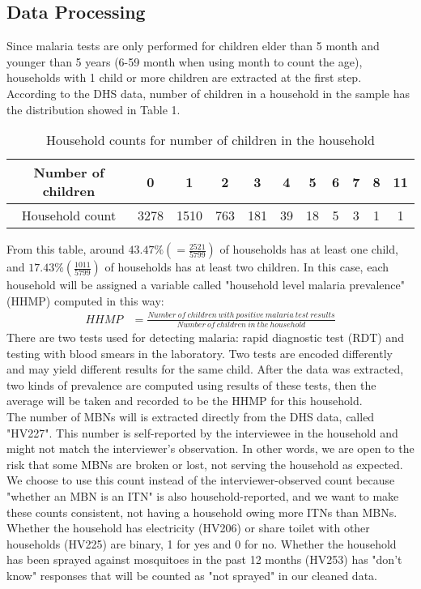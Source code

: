 \documentclass[11pt]{article}
\begin{document}
\subsection{Data Processing}
Since malaria tests are only performed for children elder than 5 month and younger than 5 years (6-59 month when using month to count the age), households with 1 child or more children are extracted at the first step. According to the DHS data, number of children in a household in the sample has the distribution showed in Table 1.
\begin{table}[h]
\centering
 \begin{tabular}{c | c c c c c c c c c c} 
 Number of children & 0 & 1 & 2 & 3 & 4 & 5 & 6 & 7 & 8 & 11 \\ 
 \hline
 Household count & 3278 & 1510 & 763 & 181 & 39 & 18 & 5 & 3 & 1 & 1
\end{tabular}
\caption{Household counts for number of children in the household}
\label{tab:abc}
\end{table}
From this table, around $43.47\% (=\frac{2521}{5799})$ of households has at least one child, and $17.43\%(\frac{1011}{5799})$ of households has at least two children. In this case, each household will be assigned a variable called "household level malaria prevalence" (HHMP) computed in this way:
\begin{align*}
    HHMP &= \frac{Number\ of\ children\ with\ positive\  malaria\ test\  results}{Number\ of\ children\ in\ the\ household}
\end{align*}
There are two tests used for detecting malaria: rapid diagnostic test (RDT) and testing with blood smears in the laboratory. Two tests are encoded differently and may yield different results for the same child. After the data was extracted, two kinds of prevalence are computed using results of these tests, then the average will be taken and recorded to be the HHMP for this household.  \\
The number of MBNs will is extracted directly from the DHS data, called "HV227". This number is self-reported by the interviewee in the household and might not match the interviewer's observation. In other words, we are open to the risk that some MBNs are broken or lost, not serving the household as expected. We choose to use this count instead of the interviewer-observed count because "whether an MBN is an ITN" is also household-reported, and we want to make these counts consistent, not having a household owing more ITNs than MBNs.  \\
Whether the household has electricity (HV206) or share toilet with other households (HV225) are binary, 1 for yes and 0 for no. Whether the household has been sprayed against mosquitoes in the past 12 months (HV253) has "don't know" responses that will be counted as "not sprayed" in our cleaned data.  \\
\end{document}
